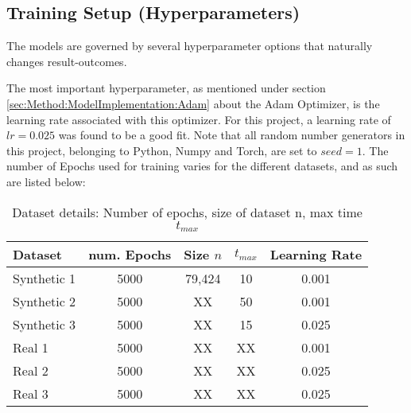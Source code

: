 \subsection{Training Setup (Hyperparameters)}
\label{sec:Method:Reproducibility:TrainingSetup}
The models are governed by several hyperparameter options that naturally changes result-outcomes.

The most important hyperparameter, as mentioned under section \ref{sec:Method:ModelImplementation:Adam} about the Adam Optimizer, is the learning rate associated with this optimizer. 
For this project, a learning rate of $lr = 0.025$ was found to be a good fit.
Note that all random number generators in this project, belonging to Python, Numpy and Torch, are set to $seed = 1$.
The number of Epochs used for training varies for the different datasets, and as such are listed below:

\begin{table}[H]
\centering
\begin{tabular}{|l|cccc|}
\hline
Dataset      & num. Epochs & Size $n$ & $t_{max}$ & Learning Rate \\ \hline
Synthetic 1  & 5000          & 79,424   & 10        & 0.001       \\
Synthetic 2  & 5000          & XX       & 50        & 0.001         \\
Synthetic 3  & 5000          & XX       & 15        & 0.025         \\
Real 1      & 5000          & XX       & XX        & 0.001         \\
Real 2      & 5000          & XX       & XX        & 0.025         \\
Real 3      & 5000          & XX       & XX        & 0.025         \\ \hline
\end{tabular}
\caption{Dataset details: Number of epochs, size of dataset n, max time $t_{max}$}
\label{tab:DatasetDetails}
\end{table}